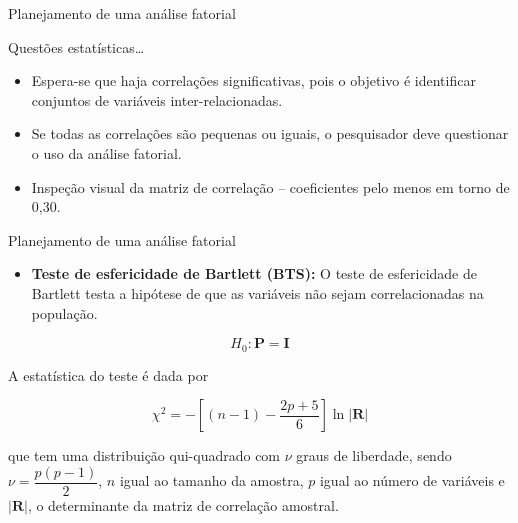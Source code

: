 \documentclass[
  ignorenonframetext,
  aspectratio=169,
]{beamer}
\providecommand{\tightlist}{%
  \setlength{\itemsep}{0pt}\setlength{\parskip}{0pt}}
\begin{document}
\begin{frame}{Planejamento de uma análise fatorial}
\label{planejamento-de-uma-anuxe1lise-fatorial-4}
\begin{block}{Questões estatísticas\ldots{}}
\label{questuxf5es-estatuxedsticas}
\begin{itemize}
\tightlist
\item
  Espera-se que haja correlações significativas, pois o objetivo é
  identificar conjuntos de variáveis inter-relacionadas.
\end{itemize}

\vspace{0.3cm}

\begin{itemize}
\tightlist
\item
  Se todas as correlações são pequenas ou iguais, o pesquisador deve
  questionar o uso da análise fatorial.
\end{itemize}

\vspace{0.3cm}

\begin{itemize}
\tightlist
\item
  Inspeção visual da matriz de correlação -- coeficientes pelo menos em
  torno de 0,30.
\end{itemize}
\end{block}
\end{frame}

\begin{frame}{Planejamento de uma análise fatorial}
\label{planejamento-de-uma-anuxe1lise-fatorial-5}
\begin{itemize}
\tightlist
\item
  \textbf{Teste de esfericidade de Bartlett (BTS):} O teste de
  esfericidade de Bartlett testa a hipótese de que as variáveis não
  sejam correlacionadas na população.
\end{itemize}

\[H_0: \boldsymbol{P} = \boldsymbol{I}\]

A estatística do teste é dada por

\[\chi^2 = -\left[ (n-1)-\dfrac{2p + 5}{6}\right] \ln|\boldsymbol{R}|\]

que tem uma distribuição qui-quadrado com \(\nu\) graus de liberdade,
sendo \(\nu = \dfrac{p(p-1)}{2}\), \(n\) igual ao tamanho da amostra,
\(p\) igual ao número de variáveis e \(|\boldsymbol{R}|\), o
determinante da matriz de correlação amostral.
\end{frame}
\end{document}
